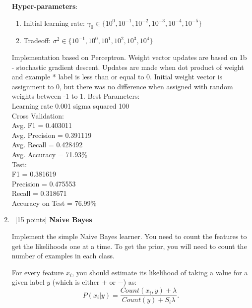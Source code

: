 \begin{enumerate}
  \textbf{Hyper-parameters}: 
  \begin{enumerate}
  \item Initial learning rate: $\gamma_0\in\{10^0, 10^{-1}, 10^{-2}, 10^{-3}, 10^{-4}, 10^{-5}\}$
  \item Tradeoff: $\sigma^2\in \{10^{-1}, 10^0, 10^{1}, 10^{2}, 10^{3}, 10^{4}\}$
  \end{enumerate}
  Implementation based on Perceptron. Weight vector updates are based on 1b - stochastic gradient descent. Updates are made when dot product of weight and example * label is less than or equal to 0. Initial weight vector is assignment to 0, but there was no difference when assigned with random weights between -1 to 1.
  Best Parameters:\\
  \hspace*{4mm}Learning rate 0.001
  \hspace*{4mm}sigma squared 100\\
  \hspace*{8mm}Cross Validation:\\
  \hspace*{12mm}Avg. F1 = 0.403011\\
  \hspace*{12mm}Avg. Precision = 0.391119\\
  \hspace*{12mm}Avg. Recall = 0.428492\\
  \hspace*{12mm}Avg. Accuracy = 71.93\%\\
  \hspace*{8mm}Test:\\
  \hspace*{12mm}F1 = 0.381619\\
  \hspace*{12mm}Precision = 0.475553\\
  \hspace*{12mm}Recall = 0.318671\\
  \hspace*{12mm}Accuracy on Test = 76.99\%\\
  
\item~[15 points] \textbf{Naive Bayes}

  Implement the simple Naive Bayes learner. You need to count the
  features to get the likelihoods one at a time. To get the prior, you
  will need to count the number of examples in each class.  

  For every feature $x_i$, you should estimate its likelihood of
  taking a value for a given label $y$ (which is either $+$ or $-$)
  as:
  \begin{equation*}
    P(x_i \vert y) = \frac{Count(x_i, y)+\lambda}{Count(y)+S_i\lambda}.
  \end{equation*}


\end{enumerate}
